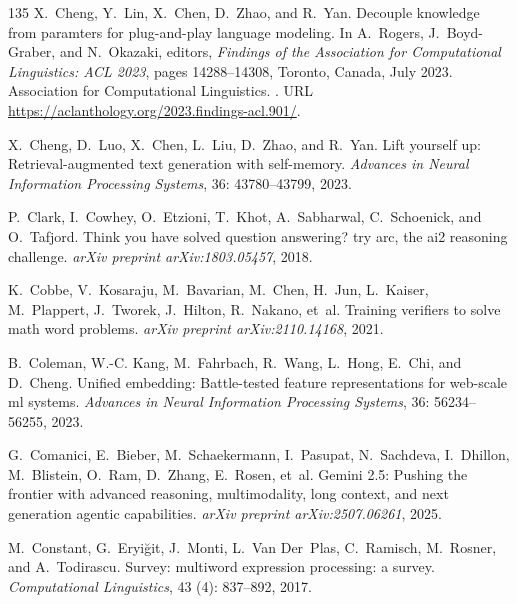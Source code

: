 \begin{thebibliography}{135}
X.~Cheng, Y.~Lin, X.~Chen, D.~Zhao, and R.~Yan.
\newblock Decouple knowledge from paramters for plug-and-play language
  modeling.
\newblock In A.~Rogers, J.~Boyd-Graber, and N.~Okazaki, editors, \emph{Findings
  of the Association for Computational Linguistics: ACL 2023}, pages
  14288--14308, Toronto, Canada, July 2023{}. Association for
  Computational Linguistics.
\newblock {}.
\newblock URL \url{https://aclanthology.org/2023.findings-acl.901/}.

X.~Cheng, D.~Luo, X.~Chen, L.~Liu, D.~Zhao, and R.~Yan.
\newblock Lift yourself up: Retrieval-augmented text generation with
  self-memory.
\newblock \emph{Advances in Neural Information Processing Systems},
  36: 43780--43799, 2023{}.

P.~Clark, I.~Cowhey, O.~Etzioni, T.~Khot, A.~Sabharwal, C.~Schoenick, and
  O.~Tafjord.
\newblock Think you have solved question answering? try arc, the ai2 reasoning
  challenge.
\newblock \emph{arXiv preprint arXiv:1803.05457}, 2018.

K.~Cobbe, V.~Kosaraju, M.~Bavarian, M.~Chen, H.~Jun, L.~Kaiser, M.~Plappert,
  J.~Tworek, J.~Hilton, R.~Nakano, et~al.
\newblock Training verifiers to solve math word problems.
\newblock \emph{arXiv preprint arXiv:2110.14168}, 2021.

B.~Coleman, W.-C. Kang, M.~Fahrbach, R.~Wang, L.~Hong, E.~Chi, and D.~Cheng.
\newblock Unified embedding: Battle-tested feature representations for
  web-scale ml systems.
\newblock \emph{Advances in Neural Information Processing Systems},
  36: 56234--56255, 2023.

G.~Comanici, E.~Bieber, M.~Schaekermann, I.~Pasupat, N.~Sachdeva, I.~Dhillon,
  M.~Blistein, O.~Ram, D.~Zhang, E.~Rosen, et~al.
\newblock Gemini 2.5: Pushing the frontier with advanced reasoning,
  multimodality, long context, and next generation agentic capabilities.
\newblock \emph{arXiv preprint arXiv:2507.06261}, 2025.

M.~Constant, G.~Eryi{\u{g}}it, J.~Monti, L.~Van Der~Plas, C.~Ramisch,
  M.~Rosner, and A.~Todirascu.
\newblock Survey: multiword expression processing: a survey.
\newblock \emph{Computational Linguistics}, 43 (4): 837--892,
  2017.


\end{thebibliography}
